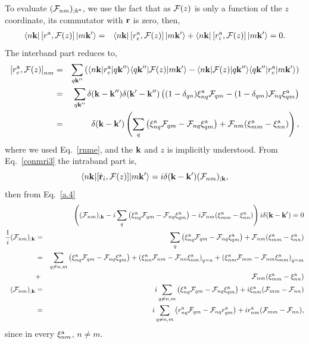 \documentclass[floatfix,prb,aps,superscriptaddress,11pt,preprint]{revtex4}
\begin{document}
To evaluate $({\mathbf{\cal F}}_{nm})_{;k^{\mathrm{a}}}$, we use the fact that as
${\mathbf{\cal F}}(z)$ is only a function of the $z$ coordinate, its commutator
with $\mathbf{r}$ is zero, then,
\begin{eqnarray}\label{a.4}
\langle n\mathbf{k} |
\left[r^{\mathrm{a}},{\mathbf{\cal F}}(z)\right]
| m\mathbf{k}' \rangle
&=&
\langle n\mathbf{k} |
\left[r_e^{\mathrm{a}},{\mathbf{\cal F}}(z)\right]
| m\mathbf{k}' \rangle
+
\langle n\mathbf{k} |
\left[r_i^{\mathrm{a}},{\mathbf{\cal F}}(z)\right]
| m\mathbf{k}' \rangle
=
 0
.
\end{eqnarray} 
The interband part reduces to,
\begin{eqnarray}\label{a.5}
\left[r_e^{\mathrm{a}},{\mathbf{\cal F}}(z)\right]_{nm}
&=&
\sum_{q\mathbf{k}''}
\left(
\langle n\mathbf{k} |
r_e^{\mathrm{a}}
| q\mathbf{k}'' \rangle
\langle q\mathbf{k}'' |
{\mathbf{\cal F}}(z)
| m\mathbf{k}' \rangle
-
\langle n\mathbf{k} |
{\mathbf{\cal F}}(z)
 | q\mathbf{k}'' \rangle
\langle q\mathbf{k}'' |
r_e^{\mathrm{a}}
| m\mathbf{k}' \rangle
\right)
\nonumber\\
&=&
\sum_{q\mathbf{k}''}
\delta(\mathbf{k}-\mathbf{k}'')
\delta(\mathbf{k}'-\mathbf{k}'')
\left(
(1-\delta_{qn})
\xi_{nq}^{\mathrm{a}}
{\mathbf{\cal F}}_{qm}
-
(1-\delta_{qm})
{\mathbf{\cal F}}_{nq}
\xi_{qm}^{\mathrm{a}}
\right)
\nonumber\\
&=&
\delta(\mathbf{k}-\mathbf{k}')
\left(
\sum_{q}
\left(
\xi_{nq}^{\mathrm{a}}
{\mathbf{\cal F}}_{qm}
-
{\mathbf{\cal F}}_{nq}
\xi_{qm}^{\mathrm{a}}
\right)
+
{\mathbf{\cal F}}_{nm}(\xi_{mm}^{\mathrm{a}}-\xi_{nn}^{\mathrm{a}})
\right)
,
\end{eqnarray}
where we used Eq.~\eqref{rnme}, and the $\mathbf{k}$ and $z$ is implicitly
understood. From Eq.~\eqref{conmri3} the intraband part is,
\begin{equation}\label{a.6}
\langle n\mathbf{k} |[\hat{\mathbf{r}}_i,{\mathbf{\cal F}}(z)]| m\mathbf{k}' \rangle
=i\delta(\mathbf{k}-\mathbf{k}')({\mathbf{\cal F}}_{nm})_{;\mathbf{k}}
,
\end{equation}
then from Eq.~\eqref{a.4}
\begin{eqnarray}\label{a.7}
&&
\left(
({\mathbf{\cal F}}_{nm})_{;\mathbf{k}}
-i
\sum_{q}
\left(
\xi_{nq}^{\mathrm{a}}
{\mathbf{\cal F}}_{qm}
-
{\mathbf{\cal F}}_{nq}
\xi_{qm}^{\mathrm{a}}
\right)
-i
{\mathbf{\cal F}}_{nm}(\xi_{mm}^{\mathrm{a}}-\xi_{nn}^{\mathrm{a}})
\right) i\delta(\mathbf{k}-\mathbf{k}')
=0
\nonumber\\
\frac{1}{i}({\mathbf{\cal F}}_{nm})_{;\mathbf{k}}
&=&
\sum_{q}
\left(
\xi_{nq}^{\mathrm{a}}
{\mathbf{\cal F}}_{qm}
-
{\mathbf{\cal F}}_{nq}
\xi_{qm}^{\mathrm{a}}
\right)
+
{\mathbf{\cal F}}_{nm}(\xi_{mm}^{\mathrm{a}}-\xi_{nn}^{\mathrm{a}})
\nonumber\\
&=&
\sum_{q\ne n,m}
\left(
\xi_{nq}^{\mathrm{a}}
{\mathbf{\cal F}}_{qm}
-
{\mathbf{\cal F}}_{nq}
\xi_{qm}^{\mathrm{a}}
\right)
+
\left(
\xi_{nn}^{\mathrm{a}}
{\mathbf{\cal F}}_{nm}
-
{\mathbf{\cal F}}_{nn}
\xi_{nm}^{\mathrm{a}}
\right)_{q=n}
+
\left(
\xi_{nm}^{\mathrm{a}}
{\mathbf{\cal F}}_{mm}
-
{\mathbf{\cal F}}_{nm}
\xi_{mm}^{\mathrm{a}}
\right)_{q=m}
\nonumber\\
&+&
{\mathbf{\cal F}}_{nm}(\xi_{mm}^{\mathrm{a}}-\xi_{nn}^{\mathrm{a}})
\nonumber\\
({\mathbf{\cal F}}_{nm})_{;\mathbf{k}}
&=&
i\sum_{q\ne n,m}
\left(
\xi_{nq}^{\mathrm{a}}
{\mathbf{\cal F}}_{qm}
-
{\mathbf{\cal F}}_{nq}
\xi_{qm}^{\mathrm{a}}
\right)
+i\xi_{nm}^{\mathrm{a}}({\mathbf{\cal F}}_{mm}-{\mathbf{\cal F}}_{nn})
\nonumber\\
&=&
i\sum_{q\ne n,m}
\left(
r_{nq}^{\mathrm{a}}
{\mathbf{\cal F}}_{qm}
-
{\mathbf{\cal F}}_{nq}
r_{qm}^{\mathrm{a}}
\right)
+ir_{nm}^{\mathrm{a}}({\mathbf{\cal F}}_{mm}-{\mathbf{\cal F}}_{nn})
,
\end{eqnarray} 
since in every $\xi_{nm}^{\mathrm{a}}$, $n\ne m$. 
\end{document}
